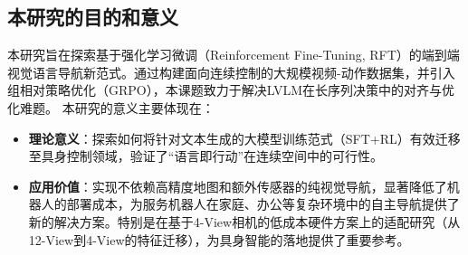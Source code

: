 \subsection{本研究的目的和意义}
本研究旨在探索基于强化学习微调（Reinforcement Fine-Tuning, RFT）的端到端视觉语言导航新范式。通过构建面向连续控制的大规模视频-动作数据集，并引入组相对策略优化（GRPO\cite{deepseek_r1}），本课题致力于解决LVLM在长序列决策中的对齐与优化难题。
本研究的意义主要体现在：
\begin{itemize}
    \item \textbf{理论意义}：探索如何将针对文本生成的大模型训练范式（SFT+RL）有效迁移至具身控制领域，验证了“语言即行动”在连续空间中的可行性。
    \item \textbf{应用价值}：实现不依赖高精度地图和额外传感器的纯视觉导航，显著降低了机器人的部署成本，为服务机器人在家庭、办公等复杂环境中的自主导航提供了新的解决方案。特别是在基于4-View相机的低成本硬件方案上的适配研究（从12-View到4-View的特征迁移），为具身智能的落地提供了重要参考。
\end{itemize}

